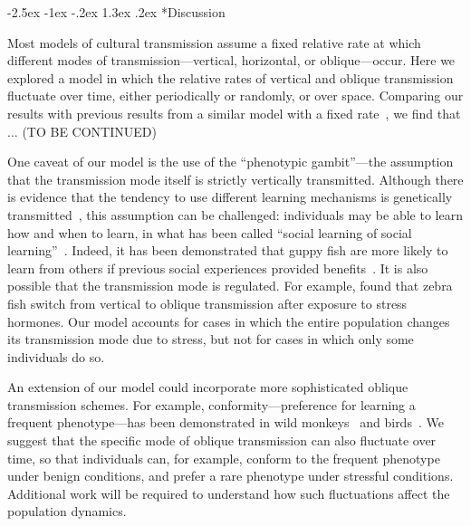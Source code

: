 \documentclass[14pt]{extarticle}
\makeatletter
\renewcommand\section{\@startsection {section}{1}{\z@}%
     {-2.5ex \@plus -1ex \@minus -.2ex}%
     {1.3ex \@plus.2ex}%
    {\Large\bfseries}}
\makeatother
\begin{document}
\section*{Discussion}

Most models of cultural transmission assume a fixed relative rate at which different modes of transmission---vertical, horizontal, or oblique---occur.
Here we explored a model in which the relative rates of vertical and oblique transmission fluctuate over time, either periodically or randomly, or over space.
Comparing our results with previous results from a similar model with a fixed rate~\citep{Ram2018}, we find that $\ldots$ (TO BE CONTINUED) %

One caveat of our model is the use of the ``phenotypic gambit''---the assumption that the transmission mode itself is strictly vertically transmitted.
Although there is evidence that the tendency to use different learning mechanisms is genetically transmitted~\citep{Foucaud2013}, this assumption can be challenged: individuals may be able to learn how and when to learn, in what has been called ``social learning of social learning''~\citep{Mesoudi2016}.
Indeed, it has been demonstrated that guppy fish are more likely to learn from others if previous social experiences provided benefits~\citep{Leris2016}.
It is also possible that the transmission mode is regulated.
For example, \citet{Farine2015} found that zebra fish switch from vertical to oblique transmission after exposure to stress hormones.
Our model accounts for cases in which the entire population changes its transmission mode due to stress, but not for cases in which only some individuals do so.

An extension of our model could incorporate more sophisticated oblique transmission schemes.
For example, conformity---preference for learning a frequent phenotype---has been demonstrated in wild monkeys~\citep{VanDeWaal2013} and birds~\citep{Aplin2015}.
We suggest that the specific mode of oblique transmission can also fluctuate over time, so that individuals can, for example, conform to the frequent phenotype under benign conditions, and prefer a rare phenotype under stressful conditions.
Additional work will be required to understand how such fluctuations affect the population dynamics. 

\end{document}
